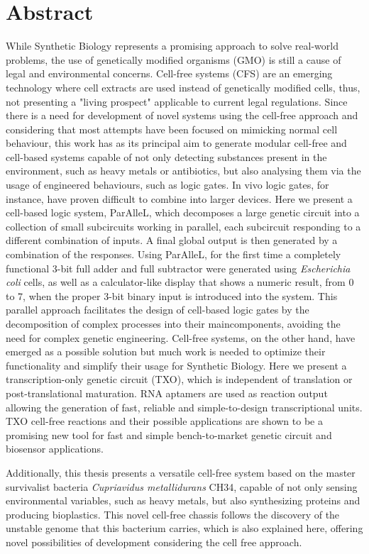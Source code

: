 \chapter{Abstract}

While Synthetic Biology represents a promising approach to solve real-world problems, the use of genetically modified organisms (GMO) is still a cause of legal and environmental concerns. Cell-free systems (CFS) are an emerging technology where cell extracts are used instead of genetically modified cells, thus, not presenting a "living prospect" applicable to current legal regulations. Since there is a need for development of novel systems using the cell-free approach and considering that most attempts have been focused on mimicking normal cell behaviour, this work has as its principal aim to generate modular cell-free and cell-based systems capable of not only detecting substances present in the environment, such as heavy metals or antibiotics, but also analysing them via the usage of engineered behaviours, such as logic gates. In vivo logic gates, for instance, have proven difficult to combine into larger devices. Here we present a cell-based logic system, ParAlleL, which decomposes a large genetic circuit into a collection of small subcircuits working in parallel, each subcircuit responding to a different combination of inputs. A final global output is then generated by a combination of the responses. Using ParAlleL, for the first time a completely functional 3-bit full adder and full subtractor were generated using \textit{Escherichia coli} cells, as well as a calculator-like display that shows a numeric result, from 0 to 7, when the proper 3-bit binary input is introduced into the system. This parallel approach facilitates the design of cell-based logic gates by the decomposition of complex processes into their maincomponents, avoiding the need for complex genetic engineering. Cell-free systems, on the other hand, have emerged as a possible solution but much work is needed to optimize their functionality and simplify their usage for Synthetic Biology. Here we present a transcription-only genetic circuit (TXO), which is independent of translation or post-translational maturation. RNA aptamers are used as reaction output allowing the generation of fast, reliable and simple-to-design transcriptional units. TXO cell-free reactions and their possible applications are shown to be a promising new tool for fast and simple bench-to-market genetic circuit and biosensor applications.

Additionally, this thesis presents a versatile cell-free system based on the master survivalist bacteria \textit{Cupriavidus metallidurans} CH34, capable of not only sensing environmental variables, such as heavy metals, but also synthesizing proteins and producing bioplastics. This novel cell-free chassis follows the discovery of the unstable genome that this bacterium carries, which is also explained here, offering novel possibilities of development considering the cell free approach. 